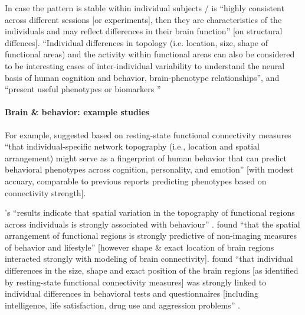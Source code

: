
In case the pattern is stable within individual subjects / is ``highly
consistent across different sessions [or experiments], then they are
characteristics of the individuals and may reflect differences in their brain
function'' \citep{kanai2011structural} [on structural diffences].
%
``Individual differences in topology (i.e. location, size, shape of functional
areas) and the activity within functional areas can also be considered to be
interesting cases of inter-individual variability to understand the neural basis
of human cognition and behavior, brain-phenotype relationships'', and ``present
useful phenotypes or biomarkers \citep{glasser2016multi,
vanhorn2008individual}''
%

\paragraph{Brain \& behavior: example studies}


%
For example, \citet{kong2019spatial} suggested based on resting-state functional
connectivity measures ``that individual-specific network topography (i.e.,
location and spatial arrangement) might serve as a fingerprint of human behavior
that can predict behavioral phenotypes across cognition, personality, and
emotion'' \citep{kong2019spatial} [with modest accuary, comparable to previous
reports predicting phenotypes based on connectivity strength].

%
\citep{bijsterbosch2018relationship}'s ``results indicate that spatial variation
in the topography of functional regions across individuals is strongly
associated with behaviour'' \citep{bijsterbosch2018relationship}.
%
\citet{bijsterbosch2018relationship} found ``that the spatial arrangement of
functional regions is strongly predictive of non-imaging measures of behavior
and lifestyle'' [however shape \& exact location of brain regions interacted
strongly with  modeling of brain connectivity].
%
\citet{bijsterbosch2018relationship} found ``that individual differences in the
size, shape and exact position of the brain regions [as identified by
resting-state functional connectivity measures] was strongly linked to
individual differences in behavioral tests and questionnaires [including
intelligence, life satisfaction, drug use and aggression problems''
\citep{bijsterbosch2018relationship}.

